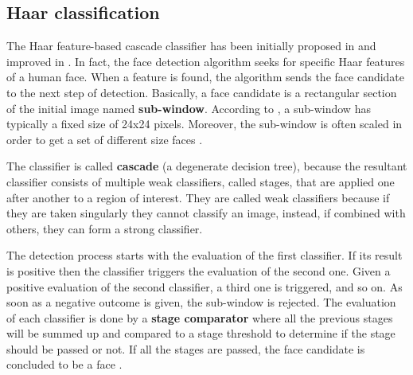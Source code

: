 \documentclass{report}
\begin{document}
\subsection{Haar classification}
The Haar feature-based cascade classifier has been initially proposed in \cite{viola2001rapid} and improved in \cite{lienhart2002extended}.
In fact, the face detection algorithm seeks for specific Haar features of a human face. When a feature is found, the algorithm sends the face candidate to the next step of detection. Basically, a face candidate is a rectangular section of the initial image named \textbf{sub-window}. According to \cite{heisele2001face}, a sub-window has typically a fixed size of 24x24 pixels. Moreover, the sub-window is often scaled in order to get a set of different size faces \cite{tripathyreal}.

The classifier is called \textbf{cascade} (a degenerate decision tree), because the resultant classifier consists of multiple weak classifiers, called stages, that are applied one after another to a region of interest. They are called weak classifiers because if they are taken singularly they cannot classify an image, instead, if combined with others, they can form a strong classifier.

The detection process starts with the evaluation of the first classifier. If its result is positive then the classifier triggers the evaluation of the second one. Given a positive evaluation of the second classifier, a third one is triggered, and so on. As soon as a negative outcome is given, the sub-window is rejected. The evaluation of each classifier is done by a \textbf{stage comparator} where all the previous stages will be summed up and compared to a stage threshold to determine if the stage should be passed or not. If all the stages are passed, the face candidate is concluded to be a face \cite{tripathyreal}.
\end{document}
